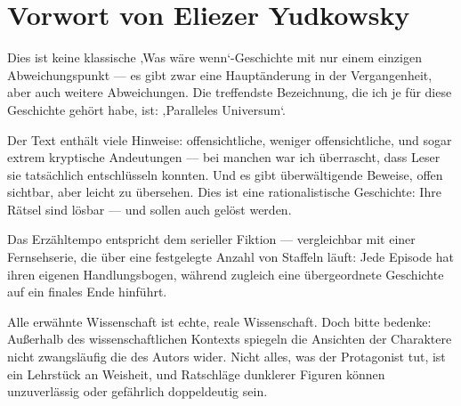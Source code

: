 \chapter*{Vorwort von Eliezer Yudkowsky}

Dies ist keine klassische ‚Was wäre wenn‘-Geschichte mit nur einem einzigen Abweichungspunkt — es gibt zwar eine Hauptänderung in der Vergangenheit, aber auch weitere Abweichungen. Die treffendste Bezeichnung, die ich je für diese Geschichte gehört habe, ist:
‚Paralleles Universum‘.

Der Text enthält viele Hinweise: offensichtliche, weniger offensichtliche, und sogar extrem kryptische Andeutungen — bei manchen war ich überrascht, dass Leser sie tatsächlich entschlüsseln konnten. Und es gibt überwältigende Beweise, offen sichtbar, aber leicht zu übersehen. Dies ist eine rationalistische Geschichte: Ihre Rätsel sind lösbar — und sollen auch gelöst werden.

Das Erzähltempo entspricht dem serieller Fiktion — vergleichbar mit einer Fernsehserie, die über eine festgelegte Anzahl von Staffeln läuft: Jede Episode hat ihren eigenen Handlungsbogen, während zugleich eine übergeordnete Geschichte auf ein finales Ende hinführt.

Alle erwähnte Wissenschaft ist echte, reale Wissenschaft. Doch bitte bedenke: Außerhalb des wissenschaftlichen Kontexts spiegeln die Ansichten der Charaktere nicht zwangsläufig die des Autors wider. Nicht alles, was der Protagonist tut, ist ein Lehrstück an Weisheit, und Ratschläge dunklerer Figuren können unzuverlässig oder gefährlich doppeldeutig sein.

